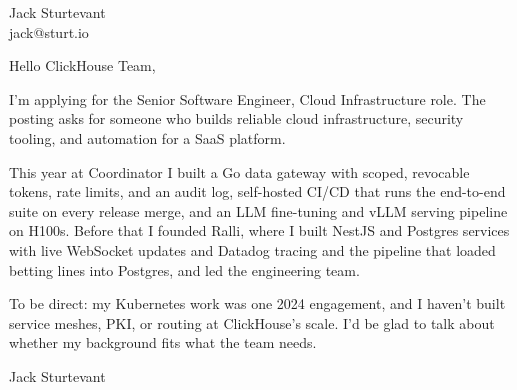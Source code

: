 \documentclass[11pt]{article}
\begin{document}
\raggedright

{\namefont\fontsize{20pt}{24pt}\selectfont Jack Sturtevant}\\[-0.3em]
jack@sturt.io

\vspace{1.2em}

Hello ClickHouse Team,

I'm applying for the Senior Software Engineer, Cloud Infrastructure role. The posting asks for someone who builds reliable cloud infrastructure, security tooling, and automation for a SaaS platform.

This year at Coordinator I built a Go data gateway with scoped, revocable tokens, rate limits, and an audit log, self-hosted CI/CD that runs the end-to-end suite on every release merge, and an LLM fine-tuning and vLLM serving pipeline on H100s. Before that I founded Ralli, where I built NestJS and Postgres services with live WebSocket updates and Datadog tracing and the pipeline that loaded betting lines into Postgres, and led the engineering team.

To be direct: my Kubernetes work was one 2024 engagement, and I haven't built service meshes, PKI, or routing at ClickHouse's scale. I'd be glad to talk about whether my background fits what the team needs.

\vspace{0.6em}
Jack Sturtevant
\end{document}
